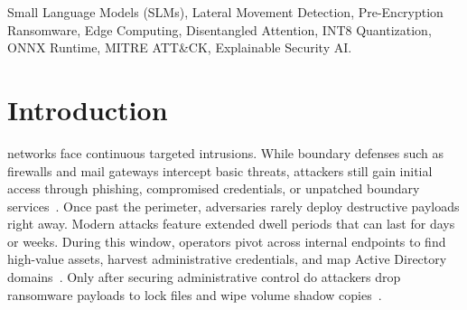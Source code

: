 \documentclass[10pt,journal,compsoc]{IEEEtran}
\begin{document}
{\begin{IEEEkeywords}
Small Language Models (SLMs), Lateral Movement Detection, Pre-Encryption Ransomware, Edge Computing, Disentangled Attention, INT8 Quantization, ONNX Runtime, MITRE ATT\&CK, Explainable Security AI.
\end{IEEEkeywords}}

\maketitle
\IEEEdisplaynontitleabstractindextext
\IEEEpeerreviewmaketitle

\section{Introduction}
 networks face continuous targeted intrusions. While boundary defenses such as firewalls and mail gateways intercept basic threats, attackers still gain initial access through phishing, compromised credentials, or unpatched boundary services~\cite{mitre2025}. Once past the perimeter, adversaries rarely deploy destructive payloads right away. Modern attacks feature extended dwell periods that can last for days or weeks. During this window, operators pivot across internal endpoints to find high-value assets, harvest administrative credentials, and map Active Directory domains~\cite{alghamdi2024, cisa2024}. Only after securing administrative control do attackers drop ransomware payloads to lock files and wipe volume shadow copies~\cite{akhtar2024}.
\end{document}
